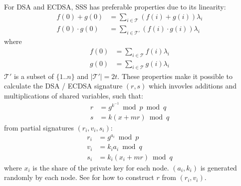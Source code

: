 For DSA and ECDSA, SSS has preferable properties due to its linearity:
\begin{align*}
f(0) + g(0) &= \sum_{i \in \mathcal{T}} (f(i) + g(i)) \lambda_i \\
f(0) \cdot g(0) &= \sum_{i \in \mathcal{T'}} (f(i) \cdot g(i)) \lambda_i
\end{align*}
where
\begin{align*}
  f(0) &= \sum_{i \in \mathcal{T}} f(i) \lambda_i \\
  g(0) &= \sum_{i \in \mathcal{T}} g(i) \lambda_i
\end{align*}
$\mathcal{T'}$ is a subset of $\{1..n\}$ and $|\mathcal{T'}| =
2t$. These properties make it possible to calculate the DSA / ECDSA
signature $(r, s)$ which invovles additions and multiplications of
shared variables, such that:
\begin{align*}
  r &= g^{k^{-1}} \bmod p \bmod q\\
  s &= k(x + mr) \bmod q
\end{align*}
from partial signatures $(r_i, v_i, s_i)$:
\begin{align*}
  r_i &= g^{a_i} \bmod p \\
  v_i &= k_ia_i \bmod q \\
  s_i &= k_i(x_i + mr) \bmod q
\end{align*}
where $x_i$ is the share of the private key for each node. $(a_i, k_i)$ is
generated randomly by each node. See \cite{Gennaro} for how to
construct $r$ from $(r_i, v_i)$.
